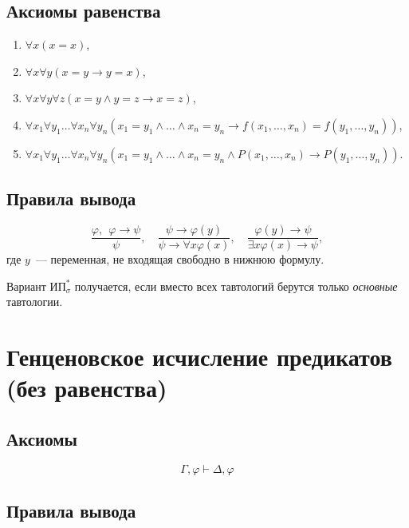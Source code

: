 \documentclass[a4paper,11pt]{article}
\begin{document}
\subsection{Аксиомы равенства}

\begin{enumerate}
\item $\forall x (x = x)$, 

\item $\forall x \forall y(x = y
\rightarrow y = x)$, 

\item $\forall x \forall y\forall z (x = y \land y
= z \rightarrow x = z)$, 

\item $\forall x_1 \forall y_1\ldots \forall
x_n \forall y_n (x_1 = y_1 \land \ldots \land x_n = y_n
\rightarrow f(x_1,\ldots,x_n) = f(y_1,\ldots, y_n))$, 

\item $\forall x_1
\forall y_1\ldots\forall x_n \forall y_n (x_1 = y_1 \land \ldots
\land x_n = y_n \land P(x_1,\ldots, x_n) \rightarrow
P(y_1,\ldots, y_n))$.
\end{enumerate}

\subsection{Правила вывода}

\[ \dfrac{\varphi,\ \ \varphi\rightarrow\psi}{\psi},\quad
\dfrac{\psi\rightarrow \varphi(y)}{\psi\rightarrow\forall
x\varphi(x)},\quad
\dfrac{\varphi(y)\rightarrow\psi}{\exists
x\varphi(x)\rightarrow\psi},\]
где $y$~— переменная, не входящая свободно в нижнюю формулу.

\noindent Вариант $\text{ИП}^*_\sigma$ получается, если вместо всех тавтологий берутся только {\it основные} тавтологии.

\pagebreak

\section{Генценовское исчисление предикатов (без равенства)}

\subsection{Аксиомы}

\[\Gamma,\varphi\vdash \Delta,\varphi\]

\subsection{Правила вывода}
\end{document}
